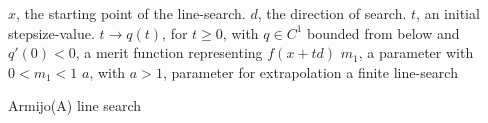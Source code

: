 \begin{algorithm}
  \begin{algorithmic}
    {\sf
      \REQUIRE $x$, the starting point of the line-search.
      \REQUIRE $d$, the direction of search.
      \REQUIRE $t$, an initial stepsize-value.
      \REQUIRE $t \to q(t)$, for $t \geq 0$, with $q \in C^1$ bounded from below and $q'(0) < 0$, a merit function representing $f(x + t d)$
      \REQUIRE $m_1$, a parameter with $0 < m_1 < 1$
      \REQUIRE $a$, with $a > 1$, parameter for extrapolation
      \ENSURE a finite line-search
      \ELSE
      \ENDIF
      \ENDWHILE
    }
  \end{algorithmic}
  \caption{Armijo(A) line search}  \label{Algo:A}
\end{algorithm}




